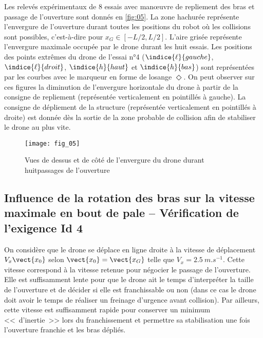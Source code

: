 \vspace{.25cm}

Les relevés expérimentaux de 8 essais avec manœuvre de repliement des bras et passage de l’ouverture sont donnés en \autoref{fig:05}. La zone hachurée représente l’envergure de l’ouverture durant toutes les positions du robot où les collisions sont possibles, c’est­-à-­dire pour $x_G \in \left[-L/2, L/2 \right]$. L’aire grisée représente l’envergure maximale occupée par le drone durant les huit essais. Les positions des points extrêmes du drone de l’essai n°4 ($\indice{\ell}{gauche}$, $\indice{\ell}{droit}$, $\indice{h}{haut}$ et $\indice{h}{bas}$) sont représentées par les courbes avec le marqueur en forme de losange $\Diamond$. On
peut observer sur ces figures la diminution de l’envergure horizontale du drone à partir de la
consigne de repliement (représentée verticalement en pointillés à gauche). La consigne de
dépliement de la structure (représentée verticalement en pointillés à droite) est donnée dès
la sortie de la zone probable de collision afin de stabiliser le drone au plus vite.

\begin{figure}[H]
\centering
\texttt{[image: fig\_05]}
\caption{\label{fig:05} Vues de dessus et de côté de l’envergure du drone durant huitpassages de l’ouverture}
\end{figure}


\ifprof
\begin{corrige}
\end{corrige}
\else
\fi

\subsection{Influence de la rotation des bras sur la vitesse maximale en bout de pale ­-- Vérification de l’exigence Id 4}

On considère que le drone se déplace en ligne droite à la vitesse de déplacement $V_x\vect{x_0}$
selon $\vect{x_0} = \vect{x_G}$ telle que $V_x = \SI{2,5}{m.s^{-1}}$. Cette vitesse correspond à la vitesse retenue pour négocier
le passage de l’ouverture. Elle est suffisamment lente pour que le drone ait le temps d’interpréter la taille de l’ouverture et de décider si elle est franchissable ou non (dans ce cas
le drone doit avoir le temps de réaliser un freinage d’urgence avant collision). Par ailleurs,
cette vitesse est suffisamment rapide pour conserver un minimum <<~d’inertie~>> lors du franchissement et permettre sa stabilisation une fois l’ouverture franchie et les bras dépliés.

